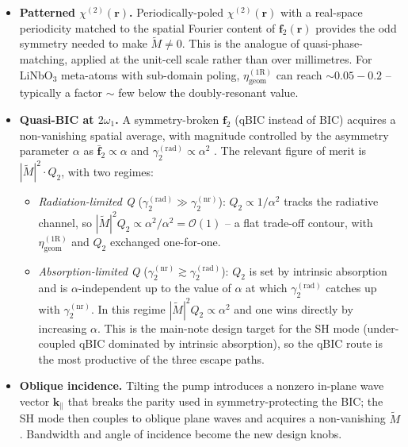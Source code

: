 \documentclass[11pt,a4paper]{article}
\newcommand{\bvec}[1]{\mathbf{#1}}
\newcommand{\f}{\bvec{f}}
\newcommand{\ri}{\bvec{r}}
\newcommand{\chitwo}{\chi^{(2)}}
\begin{document}
\begin{itemize}\setlength{\itemsep}{3pt}
  \item \textbf{Patterned $\chitwo(\ri)$.}  Periodically-poled
        $\chitwo(\ri)$ with a real-space periodicity matched to the
        spatial Fourier content of $\f_2(\ri)$ provides the odd
        symmetry needed to make $\widetilde M\neq 0$.  This is the
        analogue of quasi-phase-matching, applied at the unit-cell
        scale rather than over millimetres.  For LiNbO$_3$
        meta-atoms with sub-domain poling, $\eta_\text{geom}^{(1\mathrm R)}$
        can reach $\sim 0.05\!-\!0.2$ -- typically a factor $\sim$ few
        below the doubly-resonant value.
  \item \textbf{Quasi-BIC at $2\omega_1$.}  A symmetry-broken
        $\f_2$ (qBIC instead of BIC) acquires a non-vanishing
        spatial average, with magnitude controlled by the asymmetry
        parameter $\alpha$ as $\bar{\f}_2\propto\alpha$ and
        $\gamma_2^{(\text{rad})}\propto\alpha^{2}$
        \cite{Koshelev2018}.  The relevant figure of merit is
        $|\widetilde M|^{2}\cdot Q_2$, with two regimes:
        \begin{itemize}\setlength{\itemsep}{2pt}
          \item \emph{Radiation-limited Q}
                ($\gamma_2^{(\text{rad})}\!\gg\!\gamma_2^{(\text{nr})}$):
                $Q_2\!\propto\!1/\alpha^{2}$ tracks the radiative
                channel, so
                $|\widetilde M|^{2}Q_2\!\propto\!\alpha^{2}/\alpha^{2}
                \!=\!\mathcal O(1)$ -- a flat trade-off contour, with
                $\eta_\text{geom}^{(1\mathrm R)}$ and $Q_2$ exchanged
                one-for-one.
          \item \emph{Absorption-limited Q}
                ($\gamma_2^{(\text{nr})}\!\gtrsim\!\gamma_2^{(\text{rad})}$):
                $Q_2$ is set by intrinsic absorption and is
                $\alpha$-independent up to the value of $\alpha$ at
                which $\gamma_2^{(\text{rad})}$ catches up with
                $\gamma_2^{(\text{nr})}$.  In this regime
                $|\widetilde M|^{2}Q_2\propto\alpha^{2}$ and one wins
                directly by increasing $\alpha$.  This is the
                main-note design target for the SH mode (under-coupled
                qBIC dominated by intrinsic absorption), so the qBIC
                route is the most productive of the three escape
                paths.
        \end{itemize}
  \item \textbf{Oblique incidence.}  Tilting the pump introduces a
        nonzero in-plane wave vector $\mathbf k_\parallel$ that breaks
        the parity used in symmetry-protecting the BIC; the SH mode
        then couples to oblique plane waves and acquires a non-vanishing
        $\widetilde M$.  Bandwidth and angle of incidence become the new
        design knobs.
\end{itemize}
\end{document}
